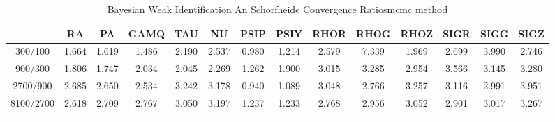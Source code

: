 \documentclass[a4paper,10pt]{article}
\begin{document}
\centering
\begin{longtable}{cccccccccccccc}
\toprule
 & RA & PA & GAMQ & TAU & NU & PSIP & PSIY & RHOR & RHOG & RHOZ & SIGR & SIGG & SIGZ \\
\midrule
300/100 & 1.664 & 1.619 & 1.486 & 2.190 & 2.537 & 0.980 & 1.214 & 2.579 & 7.339 & 1.969 & 2.699 & 3.990 & 2.746 \\
900/300 & 1.806 & 1.747 & 2.034 & 2.045 & 2.269 & 1.262 & 1.900 & 3.015 & 3.285 & 2.954 & 3.566 & 3.145 & 3.280 \\
2700/900 & 2.685 & 2.650 & 2.534 & 3.242 & 3.178 & 0.940 & 1.089 & 3.048 & 2.766 & 3.257 & 3.116 & 2.991 & 3.951 \\
8100/2700 & 2.618 & 2.709 & 2.767 & 3.050 & 3.197 & 1.237 & 1.233 & 2.768 & 2.956 & 3.052 & 2.901 & 3.017 & 3.267 \\
\bottomrule
\caption{Bayesian Weak Identification An Schorfheide Convergence Ratiosmcmc method}
\label{table:tbl:WeakAnSchoConvergenceRatios_mcmc}
\end{longtable}
\end{document}
